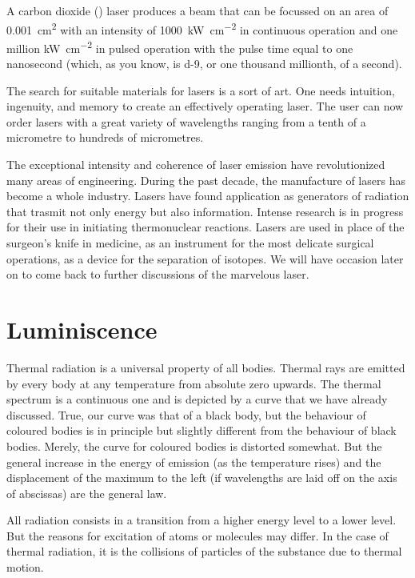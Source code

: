 A carbon dioxide () laser produces a beam that can be focussed on an area of \SI{0.001}{\centi\meter\squared} with an intensity of \SI{1000}{\kilo\watt\per\centi\meter\squared} in continuous operation and one million \si{\kilo\watt\per\centi\meter\squared} in pulsed operation with the pulse time equal to one nanosecond (which, as you know, is \num{d-9}, or one thousand millionth, of a second).

The search for suitable materials for lasers is a sort of art. One needs intuition, ingenuity, and memory to create an effectively operating laser. The user can now order lasers with a great variety of wavelengths ranging from a tenth of a micrometre to hundreds of micrometres.

The exceptional intensity and coherence of laser emission have revolutionized many areas of engineering. During the past decade, the manufacture of lasers has become a whole industry. Lasers have found application as generators of radiation that trasmit not only energy but also information. Intense research is in progress for their use in initiating thermonuclear reactions. Lasers are used in place of the surgeon's knife in medicine, as an instrument for the most delicate surgical operations, as a device for the separation of isotopes. We will have occasion later on to come back to further discussions of the marvelous laser.

\section{Luminiscence}
Thermal radiation is a universal property of all bodies. Thermal rays are emitted by every body at any temperature from absolute zero upwards. The thermal spectrum is a continuous one and is depicted by a curve that we have already discussed. True, our curve was that of a black body, but the behaviour of coloured bodies is in principle but slightly different from the behaviour of black bodies. Merely, the curve for coloured bodies is distorted somewhat. But the general increase in the energy of emission (as the temperature rises) and the displacement of the maximum to the left (if wavelengths are laid off on the axis of abscissas) are the general law.

All radiation consists in a transition from a higher energy level to a lower level. But the reasons for excitation of atoms or molecules may differ. In the case of
thermal radiation, it is the collisions of particles of the substance due to thermal motion.

